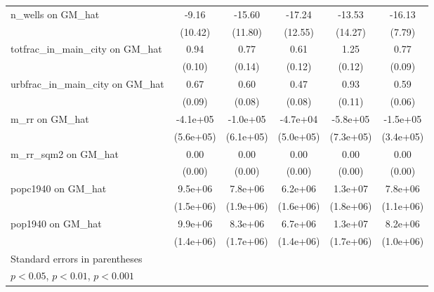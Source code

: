 \begin{table}[htbp]
\begin{tabular}{l*{5}{c}}
\addlinespace
n\_wells on GM\_hat&    -9.16         &   -15.60         &   -17.24         &   -13.53         &   -16.13\sym{*}  \\
                &  (10.42)         &  (11.80)         &  (12.55)         &  (14.27)         &   (7.79)         \\
\addlinespace
totfrac\_in\_main\_city on GM\_hat&     0.94\sym{***}&     0.77\sym{***}&     0.61\sym{***}&     1.25\sym{***}&     0.77\sym{***}\\
                &   (0.10)         &   (0.14)         &   (0.12)         &   (0.12)         &   (0.09)         \\
\addlinespace
urbfrac\_in\_main\_city on GM\_hat&     0.67\sym{***}&     0.60\sym{***}&     0.47\sym{***}&     0.93\sym{***}&     0.59\sym{***}\\
                &   (0.09)         &   (0.08)         &   (0.08)         &   (0.11)         &   (0.06)         \\
\addlinespace
m\_rr on GM\_hat  & -4.1e+05         & -1.0e+05         & -4.7e+04         & -5.8e+05         & -1.5e+05         \\
                &(5.6e+05)         &(6.1e+05)         &(5.0e+05)         &(7.3e+05)         &(3.4e+05)         \\
\addlinespace
m\_rr\_sqm2 on GM\_hat&     0.00\sym{***}&     0.00\sym{***}&     0.00\sym{***}&     0.00\sym{***}&     0.00\sym{***}\\
                &   (0.00)         &   (0.00)         &   (0.00)         &   (0.00)         &   (0.00)         \\
\addlinespace
popc1940 on GM\_hat&  9.5e+06\sym{***}&  7.8e+06\sym{***}&  6.2e+06\sym{***}&  1.3e+07\sym{***}&  7.8e+06\sym{***}\\
                &(1.5e+06)         &(1.9e+06)         &(1.6e+06)         &(1.8e+06)         &(1.1e+06)         \\
\addlinespace
pop1940 on GM\_hat&  9.9e+06\sym{***}&  8.3e+06\sym{***}&  6.7e+06\sym{***}&  1.3e+07\sym{***}&  8.2e+06\sym{***}\\
                &(1.4e+06)         &(1.7e+06)         &(1.4e+06)         &(1.7e+06)         &(1.0e+06)         \\
\bottomrule
\multicolumn{6}{l}{\footnotesize Standard errors in parentheses}\\
\multicolumn{6}{l}{\footnotesize \sym{*} \(p<0.05\), \sym{**} \(p<0.01\), \sym{***} \(p<0.001\)}\\
\end{tabular}
\end{table}
